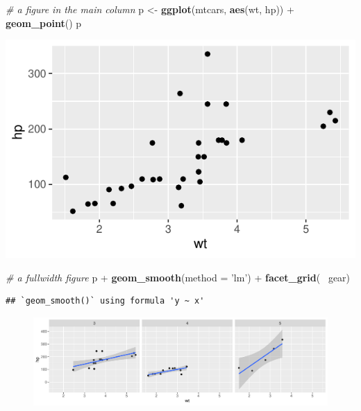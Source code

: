 \documentclass[]{tufte-book}
\newenvironment{Shaded}{}{}
\newcommand{\CommentTok}[1]{\textcolor[rgb]{0.38,0.63,0.69}{\textit{#1}}}
\newcommand{\DataTypeTok}[1]{\textcolor[rgb]{0.56,0.13,0.00}{#1}}
\newcommand{\KeywordTok}[1]{\textcolor[rgb]{0.00,0.44,0.13}{\textbf{#1}}}
\newcommand{\NormalTok}[1]{#1}
\newcommand{\OperatorTok}[1]{\textcolor[rgb]{0.40,0.40,0.40}{#1}}
\newcommand{\StringTok}[1]{\textcolor[rgb]{0.25,0.44,0.63}{#1}}
\begin{document}
\begin{Shaded}
\begin{Highlighting}[]
\CommentTok{# a figure in the main column}
\NormalTok{p <-}\StringTok{ }\KeywordTok{ggplot}\NormalTok{(mtcars, }\KeywordTok{aes}\NormalTok{(wt, hp)) }\OperatorTok{+}\StringTok{ }\KeywordTok{geom_point}\NormalTok{()}
\NormalTok{p}
\end{Highlighting}
\end{Shaded}

\includegraphics{deleteme_files/figure-latex/fig-nocap-main-1}

\begin{Shaded}
\begin{Highlighting}[]
\CommentTok{# a fullwidth figure}
\NormalTok{p }\OperatorTok{+}\StringTok{ }\KeywordTok{geom_smooth}\NormalTok{(}\DataTypeTok{method =} \StringTok{'lm'}\NormalTok{) }\OperatorTok{+}\StringTok{ }\KeywordTok{facet_grid}\NormalTok{(}\OperatorTok{~}\StringTok{ }\NormalTok{gear)}
\end{Highlighting}
\end{Shaded}

\begin{verbatim}
## `geom_smooth()` using formula 'y ~ x'
\end{verbatim}

\begin{figure}
\includegraphics{deleteme_files/figure-latex/fig-nocap-fullwidth-1} \end{figure}
\end{document}
